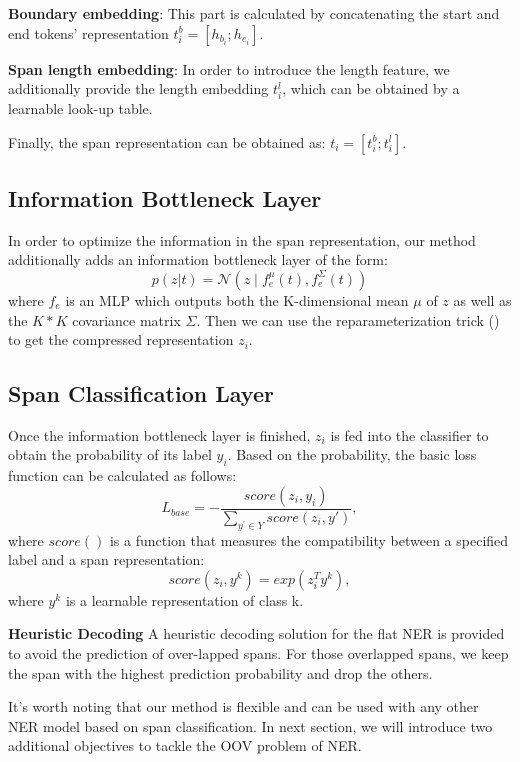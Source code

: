 \documentclass[11pt]{article}
\begin{document}
\textbf{Boundary embedding}: This part is calculated by concatenating the start and end tokens' representation $t_i^b = [h_{b_i}; h_{e_i}]$.

\textbf{Span length embedding}: In order to introduce the length feature, we additionally provide the length embedding $t_i^l$, which can be obtained by a learnable look-up table.

Finally, the span representation can be obtained as: $t_i=[t_i^b;t_i^l]$.

\subsection{Information Bottleneck Layer}
In order to optimize the information in the span representation, our method additionally adds an information bottleneck layer of the form:
\begin{equation}
    p(z|t) = \mathcal{N}\left(z \mid f_{e}^{\mu}(t), f_{e}^{\Sigma}(t)\right)
\end{equation}
where $f_e$ is an MLP which outputs both the K-dimensional mean $\mu$ of $z$ as well as the $K * K$ covariance matrix $\Sigma$. Then we 
can use the reparameterization trick (\cite{kingma2013auto}) to get the compressed representation $z_i$.


\subsection{Span Classification Layer}
Once the information bottleneck layer is finished, $z_i$ is fed into the classifier to obtain the probability of its label $y_i$. Based on the probability, the basic loss function can be calculated as follows:
\begin{equation}
    L_{base} = - \frac{score(z_i, y_i)}{\sum_{y^{'} \in Y}score(z_i, y')},
    \label{origin loss}
\end{equation}
where $score()$ is a function that measures the compatibility between a specified label and a span representation:
\begin{equation}
    score(z_i,y^k)=exp(z_i^{T}y^k),
\end{equation}
where $y^k$ is a learnable representation of class k.

\textbf{Heuristic Decoding}  A heuristic decoding solution for the flat NER is provided to avoid the prediction of over-lapped spans. For those overlapped spans, we keep the span with the highest prediction probability and drop the others.

It's worth noting that our method is flexible and can be used with any other NER model based on span classification. In next section, we will introduce two additional objectives to tackle the OOV problem of NER.
\end{document}
